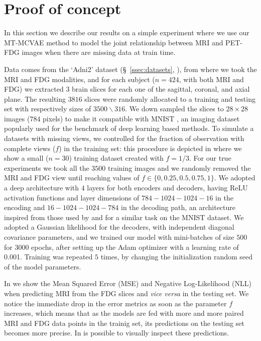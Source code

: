 \section{Proof of concept}

In this section we describe our results on a simple experiment where we use our MT-MCVAE method to model the joint relationship between MRI and PET-FDG images when there are missing data at train time.

Data comes from the `Adni2' dataset (\S~\ref{ssec:datasets}, ), from where we took the MRI and FDG modalities, and for each subject ($n=424$, with both MRI and FDG) we extracted $3$ brain slices for each one of the sagittal, coronal, and axial plane.
The resulting $3816$ slices were randomly allocated to a training and testing set with respectively sizes of $3500\backslash 316$.
We down sampled the slices to $28 \times 28$ images ($784$ pixels) to make it compatible with MNIST \citep{mnist}, an imaging dataset popularly used for the benchmark of deep learning based methods.
%
To simulate a datasets with missing views, we controlled for the fraction of observation with complete views ($f$) in the training set:
this procedure is depicted in  where we show a small ($n=30$) training dataset created with $f=1/3$.
%
For our true experiments we took all the $3500$ training images and we randomly removed the MRI and FDG view until reaching values of $f \in \{0, 0.25, 0.5, 0.75, 1\}$.
We adopted a deep architecture with $4$ layers for both encoders and decoders, having ReLU activation functions and layer dimensions of $784-1024-1024-16$ in the encoding and $16-1024-1024-784$ in the decoding path,
an architecture inspired from those used by \cite{dcca1} and \cite{dcca2} for a similar task on the MNIST dataset.
We adopted a Gaussian likelihood for the decoders, with independent diagonal covariance parameters, and we trained our model with mini-batches of size $500$ for $3000$ epochs, after setting up the Adam optimizer with a learning rate of 0.001.
Training was repeated $5$ times, by changing the initialization random seed of the model parameters.



In  we show the Mean Squared Error (MSE) and Negative Log-Likelihood (NLL) when predicting MRI from the FDG slices and \textit{vice versa} in the testing set.
We notice the immediate drop in the error metrics as soon as the parameter $f$ increases, which means that as the models are fed with more and more paired MRI and FDG data points in the trainig set, its predictions on the testing set becomes more precise.
%
In  is possible to visually inspect these predictions.

